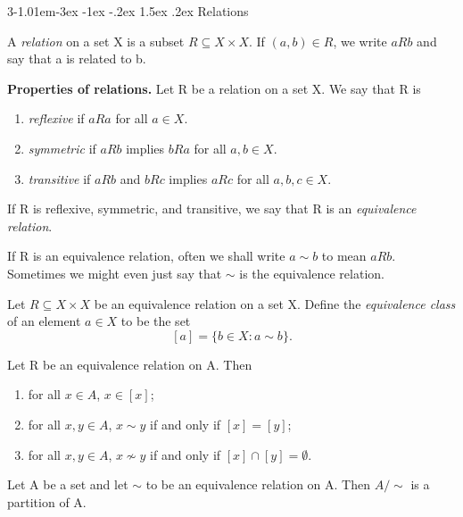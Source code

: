 \documentclass{tufte-handout}
\makeatletter
\renewcommand{\section}{\@startsection{section}%
    {3}{-1.01em}{-3ex \@plus -1ex \@minus -.2ex}%
    {1.5ex \@plus .2ex}
    {\hspace*{-5.5em}\fcolorbox{blue}{blue}{\parbox[c][1.0ex][b]{4em}{\phantom{space}}}
    \normalfont\Large\itshape\color{blue}}}
\makeatother
\begin{document}
\section{Relations}
\begin{Definition}
A \textit{relation} on a set X is a subset \( R \subseteq X \times X \).
If \( (a,b) \in R \), we write \( aRb \) and say that a is related to b.
\end{Definition}

\textbf{Properties of relations.} Let R be a relation on a set X. We say that R is
\begin{enumerate}
    \item \textit{reflexive} if \( aRa \) for all \( a \in X \).
    \item \textit{symmetric} if \( aRb \) implies \( bRa \) for all \( a,b \in X \).
    \item \textit{transitive} if \( aRb \) and \( bRc \) implies \( aRc \) for all \( a,b,c \in X \).
\end{enumerate}

\begin{Definition}
    If R is reflexive, symmetric, and transitive, we say that R is an \textit{equivalence relation}.
\end{Definition}
If R is an equivalence relation, often we shall write \( a \sim b \) to mean \( aRb \).
Sometimes we might even just say that \( \sim \) is the equivalence relation.
\begin{Definition}
    Let \(R \subseteq X \times X \) be an equivalence relation on a set X. Define the \textit{equivalence class} of an element \( a \in X \) to
    be the set
    \[ [a] = \{b \in X: a\sim b\}. \]
\end{Definition}

\begin{Proposition}
    Let R be an equivalence relation on A. Then
    \begin{enumerate}
        \item for all \( x \in A \), \( x \in [x] \);
        \item for all \( x,y \in A \), \( x\sim y \) if and only if \( [x] = [y] \);
        \item for all \( x,y \in A \), \( x \not\sim y \) if and only if \( [x] \cap [y] = \emptyset \).
    \end{enumerate}
\end{Proposition}

\begin{Proposition}
    Let A be a set and let \( \sim \) to be an equivalence relation on A. 
    Then \(A\slash \sim\) is a partition of A.
\end{Proposition}
\end{document}
